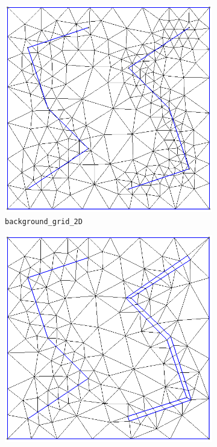 \begin{figure}[p]
    \centering
    \begin{subfigure}[b]{0.49\textwidth}
        \centering
        \includegraphics[width=\textwidth]{report/Images/Combining software/Demo gmsh4mrst/demo_background_grid_2D_lines.png}
        \caption{\texttt{background\_grid\_2D}}
        \label{fig:background_grid_2D}
    \end{subfigure}
    \begin{subfigure}[b]{0.49\textwidth}
        \centering
        \includegraphics[width=\textwidth]{report/Images/Combining software/Demo gmsh4mrst/demo_delaunay_grid_2D_lines.png}

\end{subfigure}
\end{figure}
